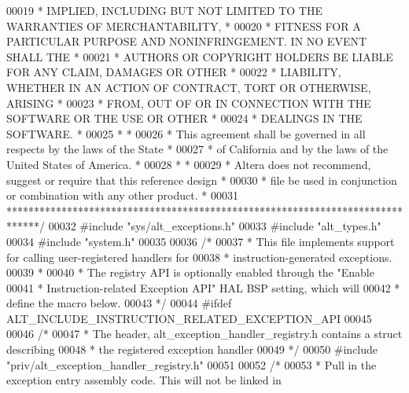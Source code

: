 \begin{DoxyCode}
00019 \textcolor{comment}{* IMPLIED, INCLUDING BUT NOT LIMITED TO THE WARRANTIES OF MERCHANTABILITY,    *}
00020 \textcolor{comment}{* FITNESS FOR A PARTICULAR PURPOSE AND NONINFRINGEMENT. IN NO EVENT SHALL THE *}
00021 \textcolor{comment}{* AUTHORS OR COPYRIGHT HOLDERS BE LIABLE FOR ANY CLAIM, DAMAGES OR OTHER      *}
00022 \textcolor{comment}{* LIABILITY, WHETHER IN AN ACTION OF CONTRACT, TORT OR OTHERWISE, ARISING     *}
00023 \textcolor{comment}{* FROM, OUT OF OR IN CONNECTION WITH THE SOFTWARE OR THE USE OR OTHER         *}
00024 \textcolor{comment}{* DEALINGS IN THE SOFTWARE.                                                   *}
00025 \textcolor{comment}{*                                                                             *}
00026 \textcolor{comment}{* This agreement shall be governed in all respects by the laws of the State   *}
00027 \textcolor{comment}{* of California and by the laws of the United States of America.              *}
00028 \textcolor{comment}{*                                                                             *}
00029 \textcolor{comment}{* Altera does not recommend, suggest or require that this reference design    *}
00030 \textcolor{comment}{* file be used in conjunction or combination with any other product.          *}
00031 \textcolor{comment}{******************************************************************************/}
00032 \textcolor{preprocessor}{#include "sys/alt_exceptions.h"}
00033 \textcolor{preprocessor}{#include "alt_types.h"}
00034 \textcolor{preprocessor}{#include "system.h"}
00035 
00036 \textcolor{comment}{/*}
00037 \textcolor{comment}{ * This file implements support for calling user-registered handlers for}
00038 \textcolor{comment}{ * instruction-generated exceptions.}
00039 \textcolor{comment}{ *}
00040 \textcolor{comment}{ * The registry API is optionally enabled through the "Enable}
00041 \textcolor{comment}{ * Instruction-related Exception API" HAL BSP setting, which will}
00042 \textcolor{comment}{ * define the macro below.}
00043 \textcolor{comment}{ */}
00044 \textcolor{preprocessor}{#ifdef ALT\_INCLUDE\_INSTRUCTION\_RELATED\_EXCEPTION\_API}
00045 
00046 \textcolor{comment}{/*}
00047 \textcolor{comment}{ * The header, alt\_exception\_handler\_registry.h contains a struct describing}
00048 \textcolor{comment}{ * the registered exception handler}
00049 \textcolor{comment}{ */}
00050 \textcolor{preprocessor}{#include "priv/alt_exception_handler_registry.h"}
00051 
00052 \textcolor{comment}{/*}
00053 \textcolor{comment}{ * Pull in the exception entry assembly code. This will not be linked in }

\end{DoxyCode}
